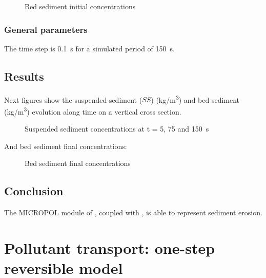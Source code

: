 \begin{figure}[H]
 \centering
\caption{Bed sediment initial concentrations}
 \label{fig:waq3d_micropol:sf_i_bump}
\end{figure}

\subsubsection{General parameters}

The time step is 0.1~s for a simulated period of 150~s.

\subsection{Results}

Next figures show the suspended sediment ($SS$) (kg/m\textsuperscript{3}) and bed sediment (kg/m\textsuperscript{3}) evolution along time on a vertical cross section.

\begin{figure}[H]
 \centering

\caption{Suspended sediment concentrations at t = 5, 75 and 150~s}
 \label{fig:waq3d_micropol:ss_m}
\end{figure}

And bed sediment final concentrations:

\begin{figure}[H]
 \centering

\caption{Bed sediment final concentrations}
 \label{fig:waq3d_micropol:ss_f_bump}
\end{figure}

\subsection{Conclusion}

The MICROPOL module of \waqtel, coupled with , is able to represent sediment erosion.

\section{Pollutant transport: one-step reversible model}

